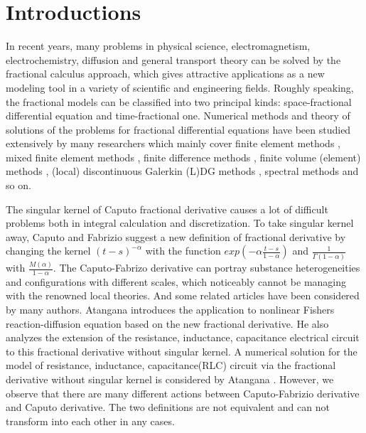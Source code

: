 \documentclass[3p,times]{elsarticle}
\begin{document}
\section{Introductions}
In recent years, many problems in physical science, electromagnetism, electrochemistry, diffusion and general transport theory can be solved by the fractional calculus approach, which gives attractive applications as a new modeling tool in a variety of scientific and engineering fields. Roughly speaking, the fractional models can be classified into two principal kinds: space-fractional differential equation and time-fractional one. Numerical methods and theory of solutions of the problems for fractional differential equations have been studied extensively by many researchers which mainly cover finite element methods \cite{zhang2012finite,jiang2011high,li2010finite,zeng2013use}, mixed finite element methods \cite{liu2014new,zhao2015two,liu2014mixed,liu2015h}, finite difference methods \cite{sousa2012second,sousa2014explicit,sousa2009finite,huang2013two}, finite volume (element) methods \cite{cheng2015eulerian,liu2014new1}, (local) discontinuous Galerkin (L)DG methods \cite{wei2014analysis}, spectral methods \cite{lin2007finite,lin2011finite} and so on.

The singular kernel of Caputo fractional derivative causes a lot of difficult problems both in integral calculation and discretization.   To take singular kernel away, Caputo and Fabrizio \cite{caputo2015new} suggest a new definition of fractional derivative by changing the kernel $(t-s)^{-\alpha}$ with the function $exp(-\alpha\frac{t-s}{1-\alpha})$ and $\frac{1}{\Gamma(1-\alpha)}$ with $\frac{M(\alpha)}{1-\alpha}$. The Caputo-Fabrizo derivative can portray substance heterogeneities and configurations with different scales, which noticeably cannot be managing with the renowned local theories. And some related articles have been considered by many authors. Atangana \cite{atangana2016new} introduces the application to nonlinear Fishers reaction-diffusion equation based on the new fractional derivative. He \cite{atangana2015extension} also analyzes the extension of the resistance, inductance, capacitance electrical circuit to this fractional derivative without singular kernel. A numerical solution for the model of resistance, inductance, capacitance(RLC) circuit via the fractional derivative without singular kernel is considered by Atangana \cite{atangana2015numerical}. However, we observe that there are many different actions between Caputo-Fabrizio derivative and Caputo derivative. The two definitions are not equivalent and can not transform into each other in any cases.
\end{document}
